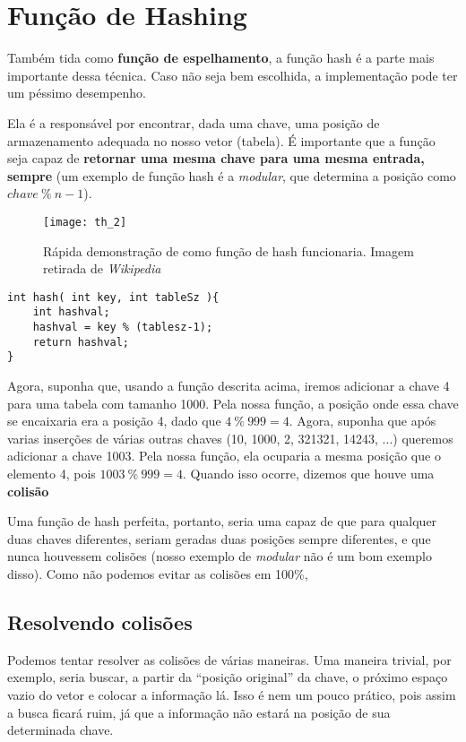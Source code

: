 \documentclass[12pt, a4paper]{article}
\begin{document}
\section{Função de Hashing}
\label{sec:hash}

Também tida como \textbf{função de espelhamento}, a função hash é a parte mais importante dessa técnica. Caso não seja bem escolhida, a implementação pode ter um péssimo desempenho.

Ela é a responsável por encontrar, dada uma chave, uma posição de armazenamento adequada no nosso vetor (tabela). É importante que a função seja capaz de \textbf{retornar uma mesma chave para uma mesma entrada, sempre} (um exemplo de função hash é a \textit{modular}, que determina a posição como $chave~\%~n-1$). 

\begin{figure}[!h]
\centering
\texttt{[image: th\_2]}
\caption{Rápida demonstração de como função de hash funcionaria. Imagem retirada de \textit{Wikipedia}\cite{wiki:hash}}
\label{hash2}
\end{figure}

\begin{lstlisting}[frame=single, captionpos=b]
int hash( int key, int tableSz ){
	int hashval;
	hashval = key % (tablesz-1);
	return hashval;
}
\end{lstlisting}

Agora, suponha que, usando a função descrita acima, iremos adicionar a chave 4 para uma tabela com tamanho 1000. Pela nossa função, a posição onde essa chave se encaixaria era a posição 4, dado que $4~\%~999 = 4$. Agora, suponha que após varias inserções de várias outras chaves (10, 1000, 2, 321321, 14243, ...) queremos adicionar a chave 1003. Pela nossa função, ela ocuparia a mesma posição que o elemento 4, pois $1003~\%~999 = 4$. Quando isso ocorre, dizemos que houve uma \textbf{colisão}

Uma função de hash perfeita, portanto, seria uma capaz de que para qualquer duas chaves diferentes, seriam geradas duas posições sempre diferentes, e que nunca houvessem colisões (nosso exemplo de \textit{modular} não é um bom exemplo disso). Como não podemos evitar as colisões em 100\%, 

\subsection{Resolvendo colisões}
Podemos tentar resolver as colisões de várias maneiras. Uma maneira trivial, por exemplo, seria buscar, a partir da ``posição original'' da chave, o próximo espaço vazio do vetor e colocar a informação lá. Isso é nem um pouco prático, pois assim a busca ficará ruim, já que a informação não estará na posição de sua determinada chave.
\end{document}
